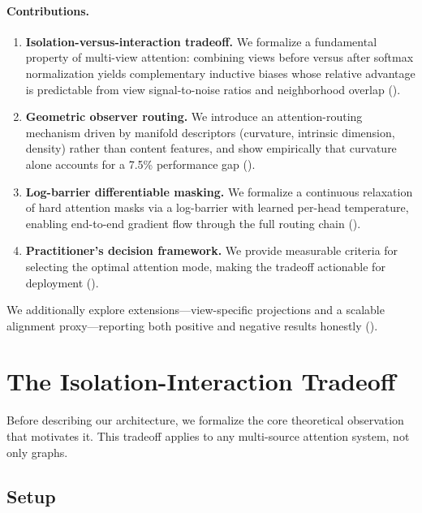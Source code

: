 \documentclass[11pt,a4paper]{article}
\begin{document}
\paragraph{Contributions.}
\begin{enumerate}[label=(\arabic*),nosep]
  \item \textbf{Isolation-versus-interaction tradeoff.}
    We formalize a fundamental property of multi-view attention:
    combining views before versus after softmax normalization yields
    complementary inductive biases whose relative advantage is
    predictable from view signal-to-noise ratios and neighborhood
    overlap ().
  \item \textbf{Geometric observer routing.}
    We introduce an attention-routing mechanism driven by manifold
    descriptors (curvature, intrinsic dimension, density) rather than
    content features, and show empirically that curvature alone
    accounts for a 7.5\% performance gap
    ().
  \item \textbf{Log-barrier differentiable masking.}
    We formalize a continuous relaxation of hard attention masks via a
    log-barrier with learned per-head temperature, enabling end-to-end
    gradient flow through the full routing chain
    ().
  \item \textbf{Practitioner's decision framework.}
    We provide measurable criteria for selecting the optimal attention
    mode, making the tradeoff actionable for deployment
    ().
\end{enumerate}
We additionally explore extensions---view-specific projections and a
scalable alignment proxy---reporting both positive and negative results
honestly ().


\section{The Isolation-Interaction Tradeoff}
\label{sec:tradeoff}

Before describing our architecture, we formalize the core theoretical
observation that motivates it.
This tradeoff applies to any multi-source attention system, not only
graphs.

\subsection{Setup}
\label{sec:tradeoff_setup}
\end{document}
